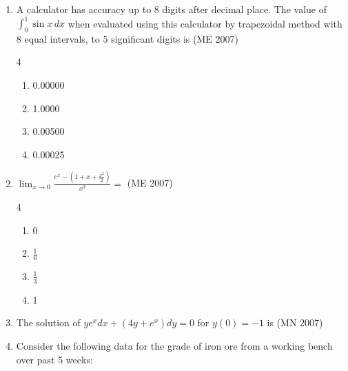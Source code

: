 \begin{enumerate}[label=\thesubsection.\arabic*,ref=\thesubsection.\theenumi]
\hfill (ME 2007)
\begin{multicols}{4}
\begin{enumerate}
\item $ -\infty < x < \infty $
\item $ -\infty < x < 1 $
\item $ x < 1, x > 1 $
\item $ -2 \leq x \leq 2 $
\end{enumerate}
\end{multicols}
\item A calculator has accuracy up to 8 digits after decimal place. The value of $ \int_0^1 \sin x \, dx $ when evaluated using this calculator by trapezoidal method with 8 equal intervals, to 5 significant digits is
\hfill (ME 2007)
\begin{multicols}{4}
\begin{enumerate}
\item 0.00000
\item 1.0000
\item 0.00500
\item 0.00025
\end{enumerate}
\end{multicols}
\item $\lim_{x \to 0} \frac{e^x - \left(1 + x + \frac{x^2}{2}\right)}{x^3} =$
\hfill (ME 2007)
\begin{multicols}{4}
\begin{enumerate}
\item 0
\item $ \frac{1}{6} $
\item $ \frac{1}{3} $
\item 1
\end{enumerate}
\end{multicols}
\item The solution of $y e^x dx + (4y + e^x) dy = 0$ for $y(0) = -1$ is
	\hfill (MN 2007)
\begin{enumerate}
\end{enumerate}
%
\item Consider the following data for the grade of iron ore from a working bench over past 5 weeks:

\end{enumerate}
